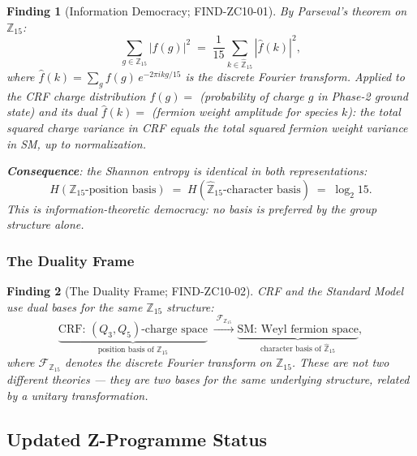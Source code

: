 \documentclass[12pt, a4paper]{article}
\newtheorem{finding}{Finding}[section]
\begin{document}
\begin{finding}[Information Democracy; FIND-ZC10-01]
\label{find:parseval}
By Parseval's theorem on $\mathbb{Z}_{15}$:
\begin{equation}
  \sum_{g \in \mathbb{Z}_{15}} |f(g)|^2
  \;=\; \frac{1}{15} \sum_{k \in \hat{\mathbb{Z}}_{15}} |\hat{f}(k)|^2,
  \label{eq:parseval}
\end{equation}
where $\hat{f}(k) = \sum_{g} f(g)\, e^{-2\pi i kg/15}$ is the
discrete Fourier transform. Applied to the CRF charge distribution
$f(g) = $ (probability of charge $g$ in Phase-2 ground state)
and its dual $\hat{f}(k) = $ (fermion weight amplitude for
species $k$): the total squared charge variance in CRF equals the
total squared fermion weight variance in SM, up to normalization.

\textbf{Consequence}: the Shannon entropy is identical in both
representations:
\begin{equation}
  H(\mathbb{Z}_{15}\text{-position basis})
  \;=\; H(\hat{\mathbb{Z}}_{15}\text{-character basis})
  \;=\; \log_2 15.
  \label{eq:entropy-equality}
\end{equation}
This is \emph{information-theoretic democracy}: no basis is
preferred by the group structure alone.
\end{finding}

\subsubsection{The Duality Frame}

\begin{finding}[The Duality Frame; FIND-ZC10-02]
\label{find:duality}
CRF and the Standard Model use \emph{dual bases} for the same
$\mathbb{Z}_{15}$ structure:
\begin{equation}
  \underbrace{\text{CRF: }(Q_3, Q_5)\text{-charge space}}_{\text{position basis of }\mathbb{Z}_{15}}
  \;\xrightarrow{\;\mathcal{F}_{\mathbb{Z}_{15}}\;}
  \underbrace{\text{SM: Weyl fermion space}}_{\text{character basis of }\hat{\mathbb{Z}}_{15}},
  \label{eq:duality-frame}
\end{equation}
where $\mathcal{F}_{\mathbb{Z}_{15}}$ denotes the discrete Fourier
transform on $\mathbb{Z}_{15}$. These are not two different
theories --- they are two bases for the same underlying structure,
related by a unitary transformation.
\end{finding}

\subsection{Updated Z-Programme Status}
\label{sec:status}
\end{document}

